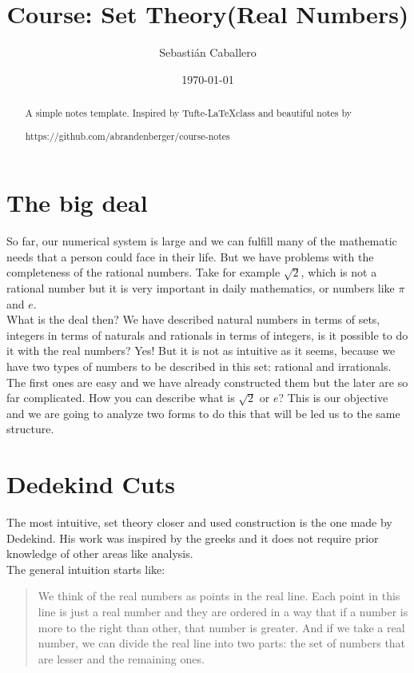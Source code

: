 \documentclass{tufte-handout}
\title{Course:  Set Theory(Real Numbers)}
\author{Sebastián Caballero}
\date{\today}
\begin{document}
\maketitle

\begin{abstract}
\noindent
A simple notes template. Inspired by Tufte-\LaTeX class and beautiful notes by \begin{verbatim*}
	https://github.com/abrandenberger/course-notes
\end{verbatim*}
\end{abstract}
\section{The big deal}
So far, our numerical system is large and we can fulfill many of the mathematic needs that a person could face in their life. But we have problems with the completeness of the rational numbers. Take for example $\sqrt{2}$, which is not a rational number but it is very important in daily mathematics, or numbers like $\pi$ and $e$.\\

What is the deal then? We have described natural numbers in terms of sets, integers in terms of naturals and rationals in terms of integers, is it possible to do it with the real numbers? Yes! But it is not as intuitive as it seems, because we have two types of numbers to be described in this set: rational and irrationals. The first ones are easy and we have already constructed them but the later are so far complicated. How you can describe what is $\sqrt{2}$ or $e$? This is our objective and we are going to analyze two forms to do this that will be led us to the same structure.

\section{Dedekind Cuts}
The most intuitive, set theory closer and used construction is the one made by Dedekind. His work was inspired by the greeks and it does not require prior knowledge of other areas like analysis.\\

The general intuition starts like:
\begin{quote}
	We think of the real numbers as points in the real line. Each point in this line is just a real number and they are ordered in a way that if a number is more to the right than other, that number is greater. And if we take a real number, we can divide the real line into two parts: the set of numbers that are lesser and the remaining ones.
\end{quote}
\end{document}
